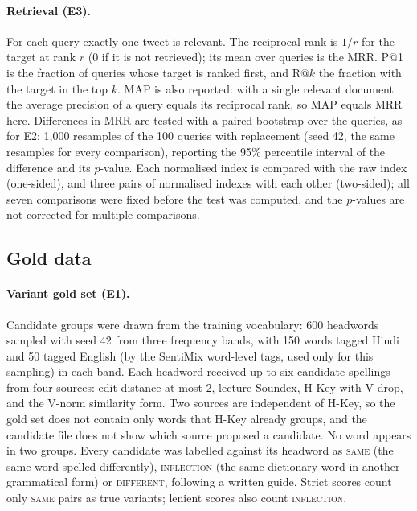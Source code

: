 \paragraph{Retrieval (E3).} For each query exactly one tweet is relevant. The reciprocal rank is
$1/r$ for the target at rank $r$ (0 if it is not retrieved); its mean over queries is the MRR.
P@1 is the fraction of queries whose target is ranked first, and R@$k$ the fraction with the target
in the top $k$. MAP is also reported: with a single relevant document the average precision of a
query equals its reciprocal rank, so MAP equals MRR here. Differences in MRR are tested with a
paired bootstrap over the queries, as for E2: 1{,}000 resamples of the 100 queries with replacement
(seed 42, the same resamples for every comparison), reporting the 95\% percentile interval of the
difference and its $p$-value. Each normalised index is compared with the raw index (one-sided), and
three pairs of normalised indexes with each other (two-sided); all seven comparisons were fixed
before the test was computed, and the $p$-values are not corrected for multiple comparisons.

\subsection{Gold data}
\label{sec:gold}

\paragraph{Variant gold set (E1).} Candidate groups were drawn from the training vocabulary: 600
headwords sampled with seed 42 from three frequency bands, with 150 words tagged Hindi and 50 tagged
English (by the SentiMix word-level tags, used only for this sampling) in each band. Each headword
received up to six candidate spellings from four sources: edit distance at most 2, lecture Soundex,
H-Key with V-drop, and the V-norm similarity form. Two sources are independent of H-Key, so the gold
set does not contain only words that H-Key already groups, and the candidate file does not show
which source proposed a candidate. No word appears in two groups. Every candidate was labelled
against its headword as \textsc{same} (the same word spelled differently), \textsc{inflection} (the
same dictionary word in another grammatical form) or \textsc{different}, following a written guide.
Strict scores count only \textsc{same} pairs as true variants; lenient scores also count
\textsc{inflection}.

